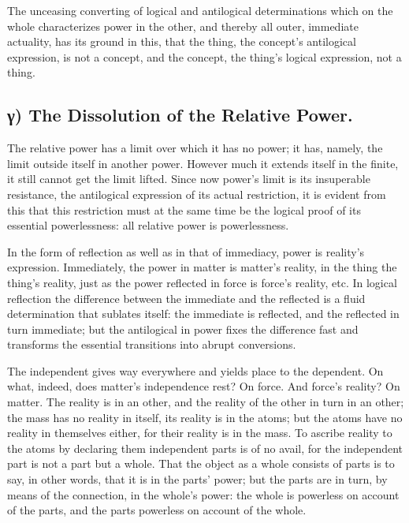\documentclass[12pt]{book}
\begin{document}
The unceasing converting of logical and antilogical determinations
which on the whole characterizes power in the other, and thereby all
outer, immediate actuality, has its ground in this, that the thing,
the concept's antilogical expression, is not a concept, and the
concept, the thing's logical expression, not a thing.

\subsection*{γ) The Dissolution of the Relative Power.}

The relative power has a limit over which it has no power; it has,
namely, the limit outside itself in another power. However much it
extends itself in the finite, it still cannot get the limit lifted.
Since now power's limit is its insuperable resistance, the
antilogical expression of its actual restriction, it is evident from
this that this restriction must at the same time be the logical
proof of its essential powerlessness: all relative power is
powerlessness.

In the form of reflection as well as in that of immediacy, power is
reality's expression. Immediately, the power in matter is matter's
reality, in the thing the thing's reality, just as the power
reflected in force is force's reality, etc. In logical reflection
the difference between the immediate and the reflected is a fluid
determination that sublates itself: the immediate is reflected, and
the reflected in turn immediate; but the antilogical in power fixes
the difference fast and transforms the essential transitions into
abrupt conversions.

The independent gives way everywhere and yields place to the
dependent. On what, indeed, does matter's independence rest? On
force. And force's reality? On matter. The reality is in an other,
and the reality of the other in turn in an other; the mass has no
reality in itself, its reality is in the atoms; but the atoms have
no reality in themselves either, for their reality is in the mass.
To ascribe reality to the atoms by declaring them independent parts
is of no avail, for
the independent part is not a part but a whole. That the object as a
whole consists of parts is to say, in other words, that it is in the
parts' power; but the parts are in turn, by means of the connection,
in the whole's power: the whole is powerless on account of the
parts, and the parts powerless on account of the whole.
\end{document}
